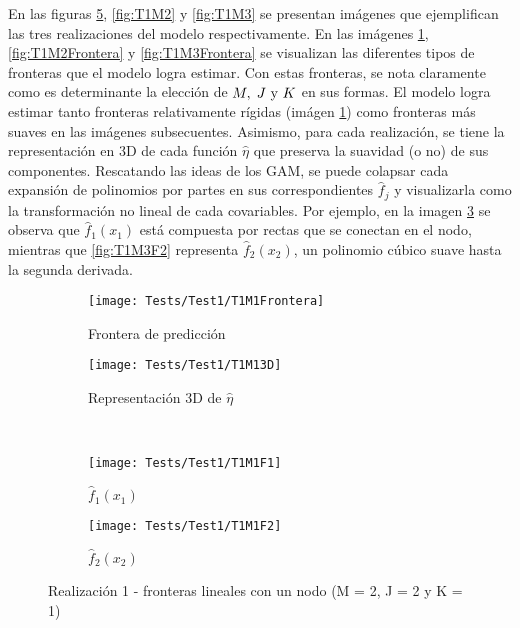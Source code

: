 \documentclass[../Main/Main.tex]{subfiles}
\begin{document}
En las figuras \ref{fig:T1M1}, \ref{fig:T1M2} y \ref{fig:T1M3} se presentan imágenes que ejemplifican las tres realizaciones del modelo respectivamente. En las imágenes \ref{fig:T1M1Frontera}, \ref{fig:T1M2Frontera} y \ref{fig:T1M3Frontera} se visualizan las diferentes tipos de fronteras que el modelo logra estimar. Con estas fronteras, se nota claramente como es determinante la elección de $M,\;J\text{ y }K$ en sus formas. El modelo logra estimar tanto fronteras relativamente rígidas (imágen \ref{fig:T1M1Frontera}) como fronteras más suaves en las imágenes subsecuentes. Asimismo, para cada realización, se tiene la representación en 3D de cada función $\hat{\eta}$ que preserva la suavidad (o no) de sus componentes. Rescatando las ideas de los GAM, se puede colapsar cada expansión de polinomios por partes en sus correspondientes $\hat{f}_j$ y visualizarla como la transformación no lineal de cada covariables. Por ejemplo, en la imagen \ref{fig:T1M1F1} se observa que $\hat{f}_1(x_1)$ está compuesta por rectas que se conectan en el nodo, mientras que \ref{fig:T1M3F2} representa $\hat{f}_2(x_2)$, un polinomio cúbico suave hasta la segunda derivada.  

\begin{figure}[p]
	\centering
	\begin{subfigure}[b]{0.45\textwidth}
    	\texttt{[image: Tests/Test1/T1M1Frontera]}
		\caption{Frontera de predicción}
		\label{fig:T1M1Frontera}
	\end{subfigure}
	\hfill    
    \begin{subfigure}[b]{0.45\textwidth}
        \texttt{[image: Tests/Test1/T1M13D]}
        \caption{Representación 3D de $\hat{\eta}$}
        \label{fig:T1M13D}
    \end{subfigure}
    \\[3pt]
    \begin{subfigure}[b]{0.45\textwidth}
    	\texttt{[image: Tests/Test1/T1M1F1]}
		\caption{$\hat{f}_1(x_1)$}
		\label{fig:T1M1F1}
	\end{subfigure}
	\hfill    
    \begin{subfigure}[b]{0.45\textwidth}
        \texttt{[image: Tests/Test1/T1M1F2]}
        \caption{$\hat{f}_2(x_2)$}
        \label{fig:T1M1F2}
    \end{subfigure}
    \caption{Realización 1 - fronteras lineales con un nodo (M = 2, J = 2 y K = 1)}
    \label{fig:T1M1}
\end{figure}
\end{document}

